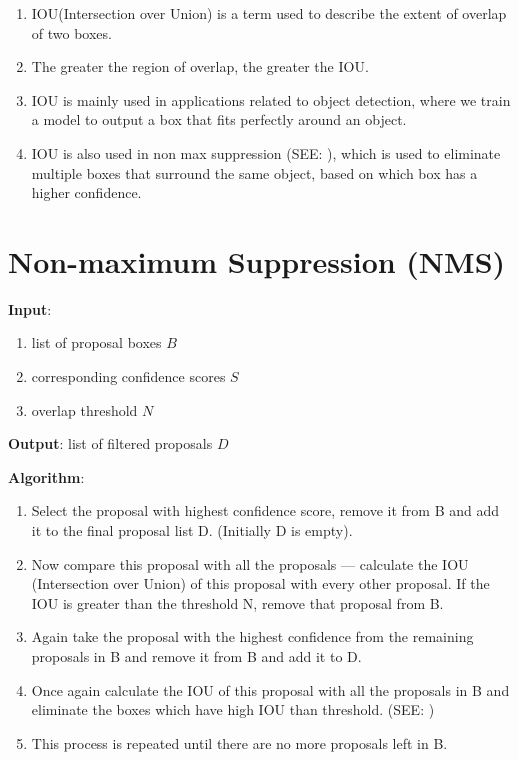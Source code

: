 \begin{enumerate}
    \item IOU(Intersection over Union) is a term used to describe the extent of overlap of two boxes. 
    
    \item The greater the region of overlap, the greater the IOU.

    \item IOU is mainly used in applications related to object detection, where we train a model to output a box that fits perfectly around an object.

    \item IOU is also used in non max suppression (SEE: ), which is used to eliminate multiple boxes that surround the same object, based on which box has a higher confidence.
\end{enumerate}




\section{Non-maximum Suppression (NMS) \cite{medium/towardsdatascience.com/non-maximum-suppression-nms-93ce178e177c}}\label{Non-maximum Suppression (NMS)}

\textbf{Input}:
\begin{enumerate}
    \item list of proposal boxes $B$

    \item corresponding confidence scores $S$
    
    \item overlap threshold $N$
\end{enumerate}

\noindent \textbf{Output}: list of filtered proposals $D$

\vspace{0.2cm}
\noindent \textbf{Algorithm}:
\begin{enumerate}
    \item Select the proposal with highest confidence score, remove it from B and add it to the final proposal list D. (Initially D is empty).

    \item Now compare this proposal with all the proposals — calculate the IOU (Intersection over Union) of this proposal with every other proposal. If the IOU is greater than the threshold N, remove that proposal from B.

    \item Again take the proposal with the highest confidence from the remaining proposals in B and remove it from B and add it to D.

    \item Once again calculate the IOU of this proposal with all the proposals in B and eliminate the boxes which have high IOU than threshold. (SEE: )

    \item This process is repeated until there are no more proposals left in B.

\end{enumerate}

